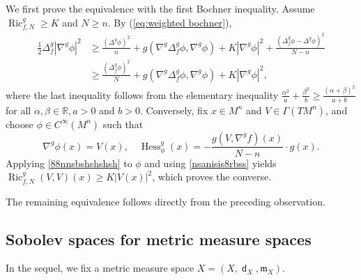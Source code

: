 \documentclass[11pt,reqno]{amsart}
\theoremstyle{definition}
\numberwithin{equation}{section}
\newcommand{\meas}{\mathfrak{m}}
\DeclareMathOperator{\dist}{\mathsf{d}}
\DeclareMathOperator{\Hess}{Hess}
\DeclareMathOperator{\Ric}{Ric}
\begin{document}
We first prove the equivalence with the first Bochner inequality. Assume $\Ric^g_{f, N}\ge K$ and $N \ge n$. By (\ref{eq:weighted bochner}), 
    \begin{align}
        \frac{1}{2}\Delta^g_f|\nabla^g\phi|^2&\ge \frac{(\Delta^g\phi)^2}{n}+g(\nabla^g\Delta^g_f\phi,\nabla^g\phi)+K|\nabla^g\phi|^2+\frac{(\Delta^g_f\phi-\Delta^g\phi)^2}{N-n} \nonumber \\
        &\ge \frac{(\Delta^g_f\phi)^2}{N}+g(\nabla^g\Delta^g_f\phi,\nabla^g\phi)+K|\nabla^g\phi|^2,
    \end{align}
    where the last inequality follows from the elementary inequality      $
        \frac{\alpha^2}{a}+\frac{\beta^2}{b}\ge \frac{(\alpha+\beta)^2}{a+b}$ for all $\alpha, \beta \in \mathbb{R}, a >0$ and $b>0$.
 Conversely, fix $x \in M^n$ and $V \in \Gamma(TM^n)$, and choose $\phi \in C^{\infty}(M^n)$ such that
    \begin{equation}\label{nsanisis8rbss}
        \nabla^g\phi(x)=V(x),\quad \Hess_{\phi}^g(x)=-\frac{g(V, \nabla^g f)(x)}{N-n}\cdot g(x).
    \end{equation}
    Applying \eqref{88nnsbshshshsh} to  $\phi$ and using \eqref{nsanisis8rbss} yields   $\Ric_{f, N}^g(V, V)(x)\ge K|V(x)|^2$, which proves the converse.

The remaining equivalence follows directly from the preceding observation. 



\subsection{Sobolev spaces for metric measure spaces}
In the sequel, we fix a metric measure space $X=(X, \dist_X, \meas_X)$.
\end{document}
